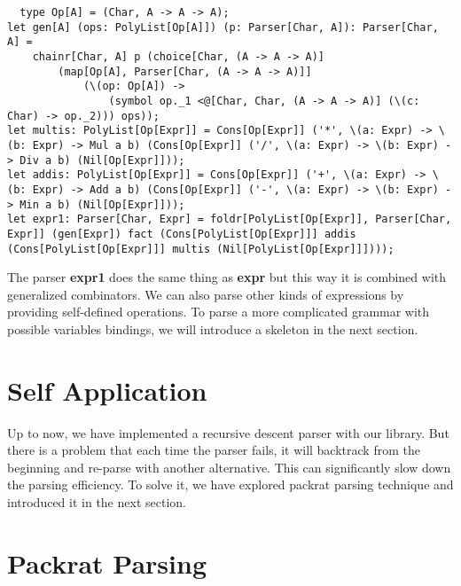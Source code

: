 \begin{lstlisting}
  type Op[A] = (Char, A -> A -> A);
let gen[A] (ops: PolyList[Op[A]]) (p: Parser[Char, A]): Parser[Char, A] =
	chainr[Char, A] p (choice[Char, (A -> A -> A)] 
		(map[Op[A], Parser[Char, (A -> A -> A)]] 
			(\(op: Op[A]) -> 
				(symbol op._1 <@[Char, Char, (A -> A -> A)] (\(c: Char) -> op._2))) ops));
let multis: PolyList[Op[Expr]] = Cons[Op[Expr]] ('*', \(a: Expr) -> \(b: Expr) -> Mul a b) (Cons[Op[Expr]] ('/', \(a: Expr) -> \(b: Expr) -> Div a b) (Nil[Op[Expr]]));
let addis: PolyList[Op[Expr]] = Cons[Op[Expr]] ('+', \(a: Expr) -> \(b: Expr) -> Add a b) (Cons[Op[Expr]] ('-', \(a: Expr) -> \(b: Expr) -> Min a b) (Nil[Op[Expr]]));
let expr1: Parser[Char, Expr] = foldr[PolyList[Op[Expr]], Parser[Char, Expr]] (gen[Expr]) fact (Cons[PolyList[Op[Expr]]] addis (Cons[PolyList[Op[Expr]]] multis (Nil[PolyList[Op[Expr]]])));
\end{lstlisting}
The parser \textbf{expr1} does the same thing as \textbf{expr} but this way it is combined with generalized combinators. We can also parse other kinds of expressions by providing self-defined operations. To parse a more complicated grammar with possible variables bindings, we will introduce a skeleton in the next section.

\section{Self Application}

Up to now, we have implemented a recursive descent parser with our library. But there is a problem that each time the parser fails, it will backtrack from the beginning and re-parse with another alternative. This can significantly slow down the parsing efficiency. To solve it, we have explored packrat parsing technique and introduced it in the next section.

\section{Packrat Parsing}
